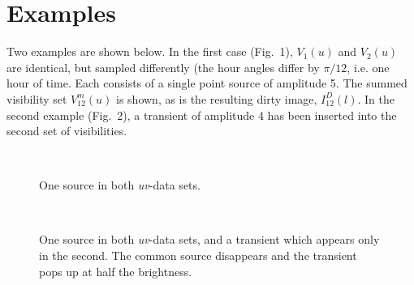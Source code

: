 \documentclass{article}
\begin{document}
\section{Examples}
Two examples are shown below.  In the first case (Fig.~1), $V_1(u)$ and
$V_2(u)$ are identical, but sampled differently (the hour angles
differ by $\pi/12$, i.e. one hour of time.  Each consists of a single
point source of amplitude 5.  The summed visibility set $V^m_{12}(u)$
is shown, as is the resulting dirty image, $I^D_{12}(l)$.  In the
second example (Fig.~2), a transient of amplitude 4 has been inserted into the
second set of visibilities.

\begin{figure}
\begin{center}
\\
\caption{One source in both {\it uv}-data sets.}
\end{center}
\end{figure}

\begin{figure}
\begin{center}
\\
\caption{One source in both {\it uv}-data sets, and a transient which
  appears only in the second.  The common source disappears and the
  transient pops up at half the brightness.}
\end{center}
\end{figure}
\end{document}
